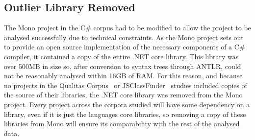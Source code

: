 \subsection{Outlier Library Removed}
The Mono project in the C\# corpus had to be modified to allow the project to be analysed successfully due to technical constraints. As the Mono project sets out to provide an open source implementation of the necessary components of a C\# compiler, it contained a copy of the entire .NET core library. This library was over 500MB in size so, after conversion to syntax trees through ANTLR, could not be reasonably analysed within 16GB of RAM. For this reason, and because no projects in the Qualitas Corpus~\cite{QualitasCorpus} or JSClassFinder~\cite{JSClassFinder} studies included copies of the source of their libraries, the .NET core library was removed from the Mono project. Every project across the corpora studied will have some dependency on a library, even if it is just the languages core libraries, so removing a copy of these libraries from Mono will ensure its comparability with the rest of the analysed data.
\newline

